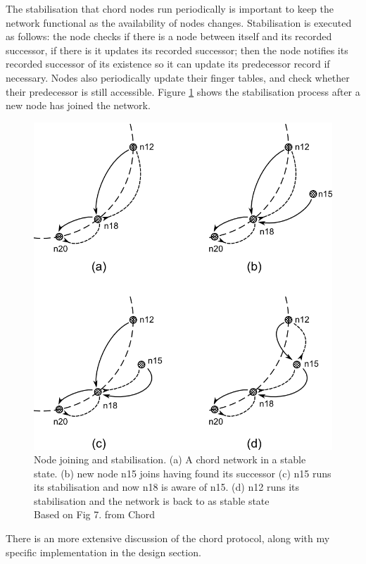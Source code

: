 \documentclass{article}
\begin{document}
The stabilisation that chord nodes run periodically is important to keep the network functional as the availability of nodes changes. Stabilisation is executed as follows: the node checks if there is a node between itself and its recorded successor, if there is it updates its recorded successor; then the node notifies its recorded successor of its existence so it can update its predecessor record if necessary. Nodes also periodically update their finger tables, and check whether their predecessor is still accessible.
Figure \ref{fig:chord_join_stab} shows the stabilisation process after a new node has joined the network.
\begin{figure}
\centering
\includegraphics{chord_joining.png}
\caption[caption]{Node joining and stabilisation. (a) A chord network in a stable state. (b) new node n15 joins having found its successor (c) n15 runs its stabilisation and now n18 is aware of n15. (d) n12 runs its stabilisation and the network is back to as stable state
\\\hspace{\textwidth} Based on Fig 7. from Chord\cite{chord}}
\label{fig:chord_join_stab}
\end{figure}

There is an more extensive discussion of the chord protocol, along with my specific implementation in the design section.
\\
\\
\end{document}
